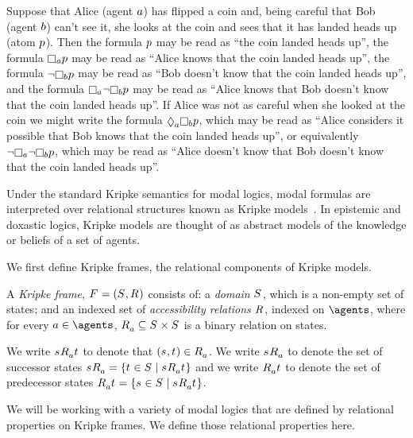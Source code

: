 \begin{example}\label{example-ml-formula}
Suppose that Alice (agent $a$) has flipped a coin and, being careful that Bob (agent $b$) can't see it, she looks at the coin and sees that it has landed heads up (atom $p$).
Then the formula $p$ may be read as ``the coin landed heads up'',
the formula $\knowsA \atomP$ may be read as ``Alice knows that the coin landed heads up'',
the formula $\lnot \knowsB \atomP$ may be read as ``Bob doesn't know that the coin landed heads up'',
and the formula $\knowsA \lnot \knowsB \atomP$ may be read as ``Alice knows that Bob doesn't know that the coin landed heads up''.
If Alice was not as careful when she looked at the coin we might write the formula $\possibleA \knowsB \atomP$, which may be read as ``Alice considers it possible that Bob knows that the coin landed heads up'', 
or equivalently $\lnot \knowsA \lnot \knowsB \atomP$, which may be read as ``Alice doesn't know that Bob doesn't know that the coin landed heads up''.
\end{example}

Under the standard Kripke semantics for modal logics, modal formulas are interpreted over relational structures known as Kripke models~\cite{tarski:1941,kripke:1959,hintikka:1962}.
In epistemic and doxastic logics, Kripke models are thought of as abstract models of the knowledge or beliefs of a set of agents.

We first define Kripke frames, the relational components of Kripke models.

\begin{definition}
A {\em Kripke frame}, $\kFrameAndTuple$ consists of:
a {\em domain} $\kStates$, which is a non-empty set of states; and
an indexed set of {\em accessibility relations} $\kAccessibilityRel$, indexed on $\agents$, where for every $\agentA \in \agents$, $\kAccessibilityA \subseteq \kStates \times \kStates$ is a binary relation on states.
\end{definition}

We write $\kStateS \kAccessibilityA \kStateT$ to denote that $(\kStateS, \kStateT) \in \kAccessibilityA$.
We write $\kSuccessorsA{\kStateS}$ to denote the set of successor states $\kSuccessorsA{\kStateS} = \{\kStateT \in \kStates \mid \kStateS \kAccessibilityA \kStateT\}$ and
we write $\kPredecessorsA{\kStateT}$ to denote the set of predecessor states $\kPredecessorsA{\kStateT} = \{\kStateS \in \kStates \mid \kStateS \kAccessibilityA \kStateT\}$.

We will be working with a variety of modal logics that are defined by relational properties on Kripke frames.
We define those relational properties here.

